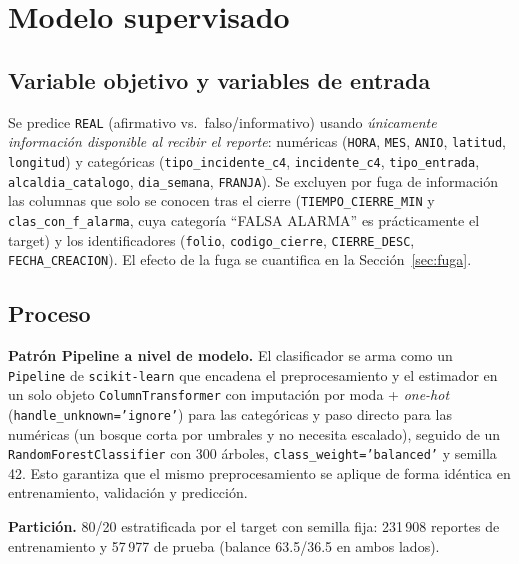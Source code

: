 \documentclass[11pt,letterpaper]{article}
\begin{document}
\section{Modelo supervisado}
\label{sec:modelo}

\subsection{Variable objetivo y variables de entrada}

Se predice \texttt{REAL} (afirmativo vs.\ falso/informativo) usando
\emph{únicamente información disponible al recibir el reporte}: numéricas
(\texttt{HORA}, \texttt{MES}, \texttt{ANIO}, \texttt{latitud},
\texttt{longitud}) y categóricas (\texttt{tipo\_incidente\_c4},
\texttt{incidente\_c4}, \texttt{tipo\_entrada}, \texttt{alcaldia\_catalogo},
\texttt{dia\_semana}, \texttt{FRANJA}). Se excluyen por fuga de información
las columnas que solo se conocen tras el cierre (\texttt{TIEMPO\_CIERRE\_MIN}
y \texttt{clas\_con\_f\_alarma}, cuya categoría ``FALSA ALARMA'' es
prácticamente el target) y los identificadores (\texttt{folio},
\texttt{codigo\_cierre}, \texttt{CIERRE\_DESC}, \texttt{FECHA\_CREACION}). El
efecto de la fuga se cuantifica en la Sección~\ref{sec:fuga}.

\subsection{Proceso}

\textbf{Patrón Pipeline a nivel de modelo.} El clasificador se arma como un
\texttt{Pipeline} de \texttt{scikit-learn} \cite{sklearn} que encadena el
preprocesamiento y el estimador en un solo objeto
\texttt{ColumnTransformer} con imputación por moda + \emph{one-hot}
(\texttt{handle\_unknown='ignore'}) para las categóricas y paso directo para
las numéricas (un bosque corta por umbrales y no necesita escalado), seguido de
un \texttt{RandomForestClassifier} \cite{rf} con 300 árboles,
\texttt{class\_weight='balanced'} y semilla 42. Esto garantiza que el mismo
preprocesamiento se aplique de forma idéntica en entrenamiento, validación y
predicción.

\textbf{Partición.} 80/20 estratificada por el target con semilla fija:
231\,908 reportes de entrenamiento y 57\,977 de prueba (balance 63.5/36.5 en
ambos lados).
\end{document}
